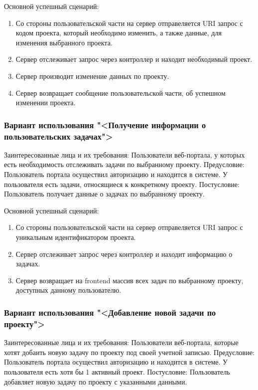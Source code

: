 Основной успешный сценарий:
\begin{enumerate}
	\item Со стороны пользовательской части на сервер отправеляется URI запрос с кодом проекта, который необходимо изменить, а также данные, для изменения выбранного проекта.
	\item Сервер отслеживает запрос через контроллер и находит необходимый проект.
	\item Сервер производит изменение данных по проекту. 
	\item Сервер возвращает сообщение пользовательской части, об успешном изменении проекта.
\end{enumerate}

\subsubsection{Вариант использования "<Получение информации о пользовательских задачах">}

Заинтересованные лица и их требования: Пользователи веб-портала, у которых есть необходимость отслеживать задачи по выбранному проекту.
Предусловие: Пользователь портала осуществил авторизацию и находится в системе. У пользователя есть задачи, относящиеся к конкретному проекту. Постусловие: Пользователь получает данные о задачах по выбранному проекту.

Основной успешный сценарий:
\begin{enumerate}
	\item Со стороны пользовательской части на сервер отправеляется URI запрос с уникальным идентификатором проекта.
	\item Сервер отслеживает запрос через контроллер и находит информацию о задачах.
	\item Сервер возвращает на frontend массив всех задач по выбранному проекту, доступных данному пользователю.
\end{enumerate}

\subsubsection{Вариант использования "<Добавление новой задачи по проекту">}

Заинтересованные лица и их требования: Пользователи веб-портала, которые хотят добаить новую задачу по проекту под своей учетной записью.
Предусловие: Пользователь портала осуществил авторизацию и находится в системе. У пользователя есть хотя бы 1 активный проект. Постусловие: Пользователь добавляет новую задачу по проекту с указанными данными.

